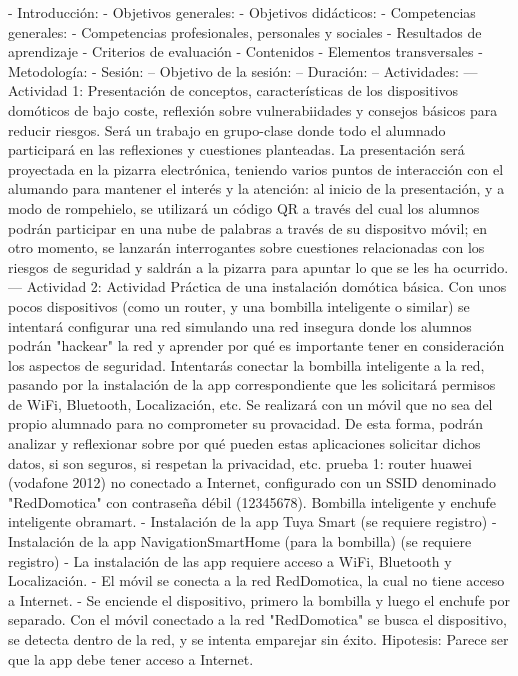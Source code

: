 \documentclass[a4paper,12pt]{report}
\begin{document}
    - Introducción:
    - Objetivos generales:
    - Objetivos didácticos:
    - Competencias generales:
    - Competencias profesionales, personales y sociales
    - Resultados de aprendizaje
    - Criterios de evaluación
    - Contenidos
    - Elementos transversales
    - Metodología:
    - Sesión:
        -- Objetivo de la sesión:
        -- Duración:
        -- Actividades:
            --- Actividad 1: Presentación de conceptos, características de los dispositivos domóticos de bajo coste, reflexión sobre vulnerabiidades y consejos básicos para reducir riesgos. Será un trabajo en grupo-clase donde todo el alumnado participará en las reflexiones y cuestiones planteadas. La presentación será proyectada en la pizarra electrónica, teniendo varios puntos de interacción con el alumando para mantener el interés y la atención: al inicio de la presentación, y a modo de rompehielo, se utilizará un código QR a través del cual los alumnos podrán participar en una nube de palabras a través de su dispositvo móvil; en otro momento, se lanzarán interrogantes sobre cuestiones relacionadas con los riesgos de seguridad y saldrán a la pizarra para apuntar lo que se les ha ocurrido.
            --- Actividad 2: Actividad Práctica de una instalación domótica básica. Con unos pocos dispositivos (como un router, y una bombilla inteligente o similar) se intentará configurar una red simulando una red insegura donde los alumnos podrán "hackear" la red y aprender por qué es importante tener en consideración los aspectos de seguridad. Intentarás conectar la bombilla inteligente a la red, pasando por la instalación de la app correspondiente que les solicitará permisos de WiFi, Bluetooth, Localización, etc. Se realizará con un móvil que no sea del propio alumnado para no comprometer su provacidad. De esta forma, podrán analizar y reflexionar sobre por qué pueden estas aplicaciones solicitar dichos datos, si son seguros, si respetan la privacidad, etc.
                prueba 1: router huawei (vodafone 2012) no conectado a Internet, configurado con un SSID denominado "RedDomotica" con contraseña débil (12345678). Bombilla inteligente y enchufe inteligente obramart. 
                    - Instalación de la app Tuya Smart (se requiere registro)
                    - Instalación de la app NavigationSmartHome (para la bombilla) (se requiere registro)
                    - La instalación de las app requiere acceso a WiFi, Bluetooth y Localización.
                    - El móvil se conecta a la red RedDomotica, la cual no tiene acceso a Internet.
                    - Se enciende el dispositivo, primero la bombilla y luego el enchufe por separado. Con el móvil conectado a la red "RedDomotica" se busca el dispositivo, se detecta dentro de la red, y se intenta emparejar sin éxito. Hipotesis: Parece ser que la app debe tener acceso a Internet.
\end{document}
